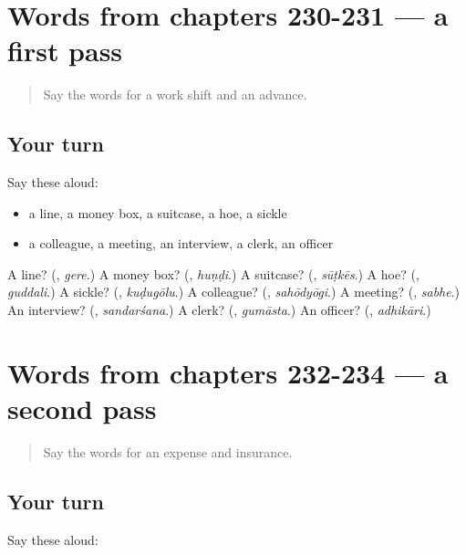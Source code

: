 \section[(dialogue)]{Words from chapters 230-231 — a first pass}

\label{lesson:KA-R234-first-pass-words-from-chapters-230-231}



\begin{quote}
Say the words for a work shift and an advance.
\end{quote}

\subsection*{Your turn}
Say these aloud:

\begin{itemize}
\raggedright
  \item a line, a money box, a suitcase, a hoe, a sickle
  \item a colleague, a meeting, an interview, a clerk, an officer
\end{itemize}

\begin{tcolorbox}[breakable,colback=teal!4,colframe=teal!35!black,title={Before you move on}]
A line? (\textbf{}, \emph{gere}.) A money box? (\textbf{}, \emph{huṇḍi}.) A suitcase? (\textbf{}, \emph{sūṭkēs}.) A hoe? (\textbf{}, \emph{guddali}.) A sickle? (\textbf{}, \emph{kuḍugōlu}.) A colleague? (\textbf{}, \emph{sahōdyōgi}.) A meeting? (\textbf{}, \emph{sabhe}.) An interview? (\textbf{}, \emph{sandarśana}.) A clerk? (\textbf{}, \emph{gumāsta}.) An officer? (\textbf{}, \emph{adhikāri}.)
\end{tcolorbox}
\section[(dialogue)]{Words from chapters 232-234 — a second pass}

\label{lesson:KA-R234-second-pass-words-from-chapters-232-234}



\begin{quote}
Say the words for an expense and insurance.
\end{quote}

\subsection*{Your turn}
Say these aloud:


